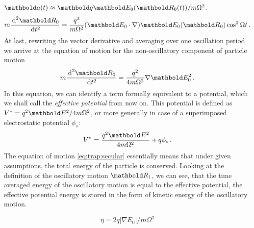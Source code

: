 $\mb a(t) \approx \mb q\mb E_0(\mb R_0(t))/m\Omega^2$.
\begin{equation}
m\frac{\de^2\mb R_0}{\de t^2} =
\frac{q^2}{m\Omega^2}(\mb E_0\cdot\nabla)\mb E_0(\mb R_0)\cos^2\Omega t\,.
\end{equation}
At last, rewriting the vector derivative and averaging over one
oscillation period we arrive at the equation of motion for the
non-oscillatory component of particle motion
\begin{equation}
m\frac{\de^2\mb R_0}{\de t^2} =
\frac{q^2}{4m\Omega^2}\nabla\mb E_0^2\,.
\label{eq:trap:secular}
\end{equation}
In this equation, we can identify a term formally equivalent
to a potential, which we shall call the {\em effective potential}
from now on. This potential is defined as
$V^* = {q^2\mb E^2}/{4m\Omega^2}$,
or more generally in case of a superimposed electrostatic potential
$\phi_s$:
\begin{equation}
V^* = \frac{q^2\mb E^2}{4m\Omega^2} + q\phi_s\,.
\end{equation}
The equation of motion \eqref{eq:trap:secular} essentially means
that under given assumptions, the total energy of the particle
is conserved. Looking at the definition of the oscillatory
motion $\mb R_1$, we can see, that the time averaged energy
of the oscillatory motion is equal to the effective potential, \ie
the effective potential energy is stored in the form of kinetic
energy of the oscillatory motion.

\begin{equation}
\eta = 2q|\nabla E_0|/m\Omega^2
\label{eq:trap:adiab}
\end{equation}
